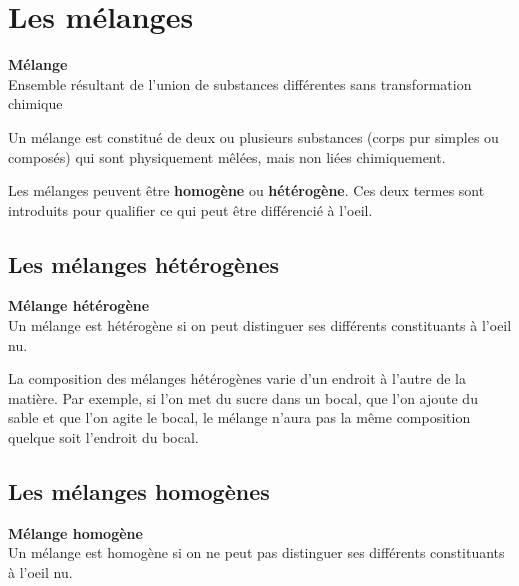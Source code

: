 \documentclass[
  11pt,
  french,
  a4paper,
  openany]{book}
\begin{document}
\hypertarget{les-muxe9langes}{%
\section{Les mélanges}\label{les-muxe9langes}}

\begin{tcolorbox}
\textbf{Mélange}\\
Ensemble résultant de l'union de substances différentes sans transformation chimique

\end{tcolorbox}

Un mélange est constitué de deux ou plusieurs substances (corps pur simples ou composés) qui sont physiquement mêlées, mais non liées chimiquement.

Les mélanges peuvent être \textbf{homogène} ou \textbf{hétérogène}. Ces deux termes sont introduits pour qualifier ce qui peut être différencié à l'oeil.

\hypertarget{les-muxe9langes-huxe9tuxe9roguxe8nes}{%
\subsection{Les mélanges hétérogènes}\label{les-muxe9langes-huxe9tuxe9roguxe8nes}}

\begin{tcolorbox}
\textbf{Mélange hétérogène}\\
Un mélange est hétérogène si on peut distinguer ses différents constituants à l'oeil nu.

\end{tcolorbox}

La composition des mélanges hétérogènes varie d'un endroit à l'autre de la matière. Par exemple, si l'on met du sucre dans un bocal, que l'on ajoute du sable et que l'on agite le bocal, le mélange n'aura pas la même composition quelque soit l'endroit du bocal.

\hypertarget{les-muxe9langes-homoguxe8nes}{%
\subsection{Les mélanges homogènes}\label{les-muxe9langes-homoguxe8nes}}

\begin{tcolorbox}
\textbf{Mélange homogène}\\
Un mélange est homogène si on ne peut pas distinguer ses différents constituants à l'oeil nu.

\end{tcolorbox}
\end{document}
